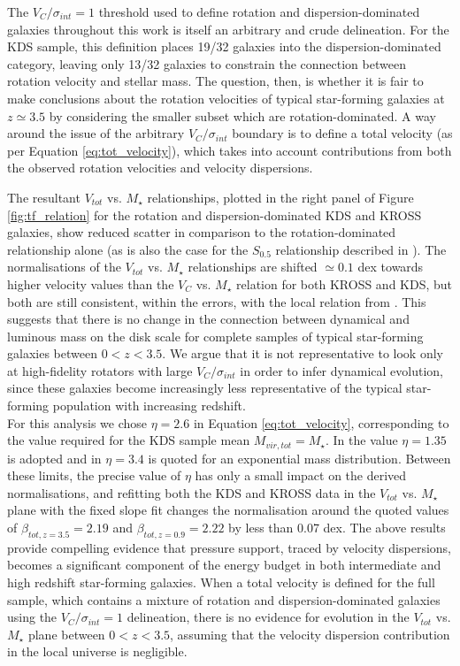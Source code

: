 \documentclass[fleqn,usenatbib]{mnras}
\begin{document}
\noindent
The $V_{C}/\sigma_{int} = 1$ threshold used to define rotation and dispersion-dominated galaxies throughout this work is itself an arbitrary and crude delineation.
For the KDS sample, this definition places 19/32 galaxies into the dispersion-dominated category, leaving only 13/32 galaxies to constrain the connection between rotation velocity and stellar mass.
The question, then, is whether it is fair to make conclusions about the rotation velocities of typical star-forming galaxies at $z\simeq3.5$ by considering the smaller subset which are rotation-dominated.
A way around the issue of the arbitrary $V_{C}/\sigma_{int}$ boundary is to define a total velocity (as per Equation \ref{eq:tot_velocity}), which takes into account contributions from both the observed rotation velocities and velocity dispersions.

The resultant $V_{tot}$ vs. $M_{\star}$ relationships, plotted in the right panel of Figure \ref{fig:tf_relation} for the rotation and dispersion-dominated KDS and KROSS galaxies, show reduced scatter in comparison to the rotation-dominated relationship alone (as is also the case for the $S_{0.5}$ relationship described in \citealt{Kassin2007,Kassin2012}).
The normalisations of the $V_{tot}$ vs. $M_{\star}$ relationships are shifted $\simeq0.1$ dex towards higher velocity values than the $V_{C}$ vs. $M_{\star}$ relation for both KROSS and KDS, but both are still consistent, within the errors, with the local relation from \cite{Reyes2011}.
This suggests that there is no change in the connection between dynamical and luminous mass on the disk scale for complete samples of typical star-forming galaxies between $0 < z < 3.5$.
We argue that it is not representative to look only at high-fidelity rotators with large $V_{C}/\sigma_{int}$ in order to infer dynamical evolution, since these galaxies become increasingly less representative of the typical star-forming population with increasing redshift. \\

\noindent
For this analysis we chose $\eta=2.6$ in Equation \ref{eq:tot_velocity}, corresponding to the value required for the KDS sample mean $M_{vir,tot} = M_{\star}$.
In \cite{Epinat2009} the value $\eta=1.35$ is adopted and in \cite{Newman2013} $\eta=3.4$ is quoted for an exponential mass distribution.
Between these limits, the precise value of $\eta$ has only a small impact on the derived normalisations, and refitting both the KDS and KROSS data in the $V_{tot}$ vs. $M_{\star}$ plane with the fixed slope fit changes the normalisation around the quoted values of $\beta_{tot,z=3.5} = 2.19$ and $\beta_{tot,z=0.9} = 2.22$ by less than 0.07 dex.
The above results provide compelling evidence that pressure support, traced by velocity dispersions, becomes a significant component of the energy budget in both intermediate and high redshift star-forming galaxies.
When a total velocity is defined for the full sample, which contains a mixture of rotation and dispersion-dominated galaxies using the $V_{C}/\sigma_{int} = 1$ delineation, there is no evidence for evolution in the $V_{tot}$ vs. $M_{\star}$ plane between $0 < z < 3.5$, assuming that the velocity dispersion contribution in the local universe is negligible.
\end{document}
